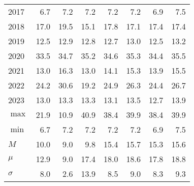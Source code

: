 \documentclass{article}
\begin{document}
\begin{table}[!ht]
\begin{tabular}{l | rrr | rr | rr}
2017 & \cellcolor{red!25}6.7 & 7.2 & 7.2 & 7.2 & 7.2 & 6.9 & \cellcolor{green!25}7.5 \\
2018 & 17.0 & \cellcolor{green!25}19.5 & \cellcolor{red!25}15.1 & 17.8 & 17.1 & 17.4 & 17.4 \\
2019 & \cellcolor{red!25}12.5 & 12.9 & 12.8 & 12.7 & 13.0 & 12.5 & \cellcolor{green!25}13.2 \\
2020 & \cellcolor{red!25}33.5 & 34.7 & 35.2 & 34.6 & 35.3 & 34.4 & \cellcolor{green!25}35.5 \\
2021 & 13.0 & \cellcolor{green!25}16.3 & \cellcolor{red!25}13.0 & 14.1 & 15.3 & 13.9 & 15.5 \\
2022 & 24.2 & \cellcolor{green!25}30.6 & \cellcolor{red!25}19.2 & 24.9 & 26.3 & 24.4 & 26.7 \\
2023 & 13.0 & 13.3 & 13.3 & 13.1 & 13.5 & \cellcolor{red!25}12.7 & \cellcolor{green!25}13.9 \\
$\max$ & 21.9 & \cellcolor{red!25}10.9 & \cellcolor{green!25}40.9 & 38.4 & 39.9 & 38.4 & 39.9 \\
$\min$ & \cellcolor{red!25}6.7 & 7.2 & 7.2 & 7.2 & 7.2 & 6.9 & \cellcolor{green!25}7.5 \\
$M$ & 10.0 & \cellcolor{red!25}9.0 & 9.8 & 15.4 & \cellcolor{green!25}15.7 & 15.3 & 15.6 \\
$\mu$  & 12.9 & \cellcolor{red!25}9.0 & 17.4 & 18.0 & 18.6 & 17.8 & \cellcolor{green!25}18.8 \\
$\sigma$ & 8.0 & \cellcolor{red!25}2.6 & \cellcolor{green!25}13.9 & 8.5 & 9.0 & 8.3 & 9.3 \\
\hline
    \end{tabular}
    \label{tab_comparison_av}
\end{table}
\end{document}
